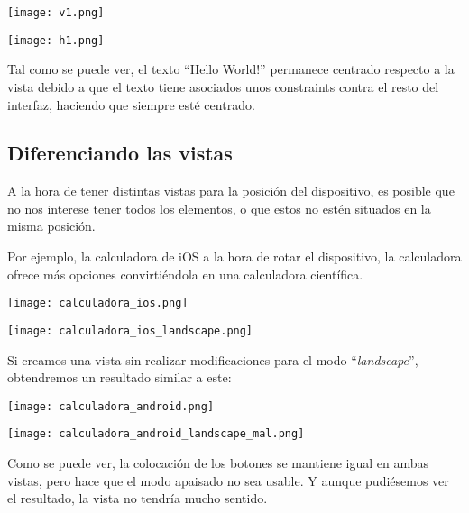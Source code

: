 {
    \hfill
    \begin{minipage}{0.3\linewidth}
        \texttt{[image: v1.png]}
    \end{minipage}
    \hfill
    \begin{minipage}{0.6\linewidth}
        \texttt{[image: h1.png]}
    \end{minipage}
    \hfill
}

Tal como se puede ver, el texto “Hello World!” permanece centrado respecto a la vista debido a que el texto tiene asociados unos constraints contra el resto del interfaz, haciendo que siempre esté centrado.


\subsection{Diferenciando las vistas}

A la hora de tener distintas vistas para la posición del dispositivo, es posible que no nos interese tener todos los elementos, o que estos no estén situados en la misma posición.

Por ejemplo, la calculadora de iOS a la hora de rotar el dispositivo, la calculadora ofrece más opciones convirtiéndola en una calculadora científica.

{
    \hfill
    \begin{minipage}{0.2\linewidth}
        \texttt{[image: calculadora\_ios.png]}
    \end{minipage}
    \hfill
    \begin{minipage}{0.4\linewidth}
        \texttt{[image: calculadora\_ios\_landscape.png]}
    \end{minipage}
    \hfill
}


Si creamos una vista sin realizar modificaciones para el modo “\textit{landscape}”, obtendremos un resultado similar a este:

{
    \hfill
    \begin{minipage}{0.3\linewidth}
        \texttt{[image: calculadora\_android.png]}
    \end{minipage}
    \hfill
    \begin{minipage}{0.6\linewidth}
        \texttt{[image: calculadora\_android\_landscape\_mal.png]}
    \end{minipage}
    \hfill
}

Como se puede ver, la colocación de los botones se mantiene igual en ambas vistas, pero hace que el modo apaisado no sea usable. Y aunque pudiésemos ver el resultado, la vista no tendría mucho sentido.

